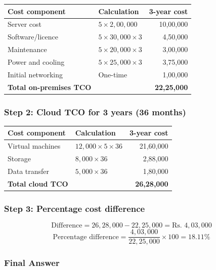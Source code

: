 \documentclass[11pt,a4paper]{article}
\begin{document}
\begin{tabularx}{\textwidth}{@{}lXr@{}}
\toprule
\rowcolor{tablehead}\textbf{Cost component} & \textbf{Calculation} & \textbf{3-year cost} \\
\midrule
Server cost & $5 \times 2{,}00{,}000$ & 10,00,000 \\
Software/licence & $5 \times 30{,}000 \times 3$ & 4,50,000 \\
Maintenance & $5 \times 20{,}000 \times 3$ & 3,00,000 \\
Power and cooling & $5 \times 25{,}000 \times 3$ & 3,75,000 \\
Initial networking & One-time & 1,00,000 \\
\midrule
\textbf{Total on-premises TCO} & & \textbf{22,25,000} \\
\bottomrule
\end{tabularx}

\subsubsection*{Step 2: Cloud TCO for 3 years (36 months)}

\begin{tabularx}{\textwidth}{@{}lXr@{}}
\toprule
\rowcolor{tablehead}\textbf{Cost component} & \textbf{Calculation} & \textbf{3-year cost} \\
\midrule
Virtual machines & $12{,}000 \times 5 \times 36$ & 21,60,000 \\
Storage & $8{,}000 \times 36$ & 2,88,000 \\
Data transfer & $5{,}000 \times 36$ & 1,80,000 \\
\midrule
\textbf{Total cloud TCO} & & \textbf{26,28,000} \\
\bottomrule
\end{tabularx}

\subsubsection*{Step 3: Percentage cost difference}

\[
\text{Difference} = 26{,}28{,}000 - 22{,}25{,}000 = \text{Rs. } 4{,}03{,}000
\]
\[
\text{Percentage difference} = \frac{4{,}03{,}000}{22{,}25{,}000} \times 100 = 18.11\%
\]

\subsubsection*{Final Answer}
\end{document}
